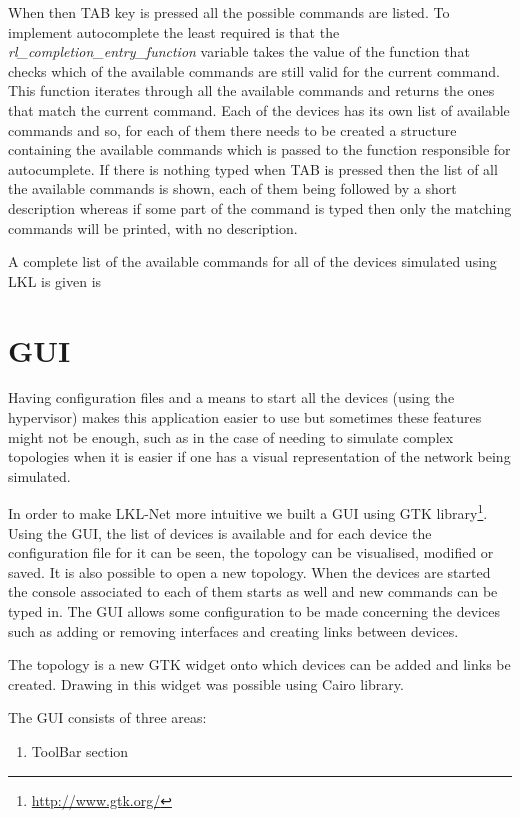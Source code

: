 {{\begin{itemize}
When then TAB key is pressed all the possible commands are listed. To implement autocomplete the least required is that the \textit{rl_completion_entry_function} variable takes the value of the function that checks which of the available commands are still valid for the current command. This function iterates through all the available commands and returns the ones that match the current command. Each of the devices has its own list of available commands and so, for each of them there needs to be created a structure containing the available commands which is passed to the function responsible for autocumplete. If there is nothing typed when TAB is pressed then the list of all the available commands is shown, each of them being followed by a short description whereas if some part of the command is typed then only the matching commands will be printed, with no description.

A complete list of the available commands for all of the devices simulated using LKL is given is 

\section{GUI}
\label{sec:gui}
Having configuration files and a means to start all the devices (using the hypervisor) makes this application easier to use but sometimes these features might not be enough, such as in the case of needing to simulate complex topologies when it is easier if one has a visual representation of the network being simulated.

In order to make LKL-Net more intuitive we built a GUI using GTK library\footnote{\url{http://www.gtk.org/}}. Using the GUI, the list of devices is available and for each device the configuration file for it can be seen, the topology can be visualised, modified or saved. It is also possible to open a new topology. When the devices are started the console associated to each of them starts as well and new commands can be typed in. The GUI allows some configuration to be made concerning the devices such as adding or removing interfaces and creating links between devices.

The topology is a new GTK widget onto which devices can be added and links be created. Drawing in this widget was possible using Cairo library.

The GUI consists of three areas:
\begin{enumerate}
\item ToolBar section


\end{enumerate}
\end{itemize}}}
